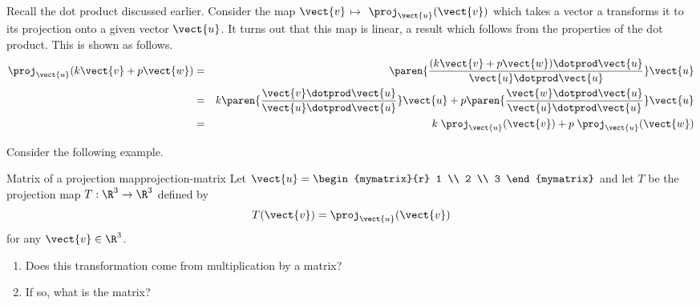 Recall the dot product discussed earlier. Consider the map $\vect{v}$\textbf{$\mapsto $}
$\proj_{\vect{u}}(\vect{v}) $ which takes a vector a transforms it to its projection onto a given vector $\vect{u}$. It turns out that
this map is linear, a result which follows from the properties of the
dot product. This is shown as follows.
\begin{eqnarray*}
\proj_{\vect{u}}(k \vect{v}+ p \vect{w})
&=&\paren{\vspace{0.05in}\frac{(k \vect{v}+ p \vect{w})\dotprod \vect{u}}{
\vect{u}\dotprod \vect{u}}} \vect{u} \\
&=& k  \paren{\vspace{0.05in}\frac{
\vect{v}\dotprod \vect{u}}{\vect{u}\dotprod \vect{u}}} \vect{u}+p \paren{\vspace{
0.05in}\frac{\vect{w}\dotprod \vect{u}}{\vect{u}\dotprod \vect{u}}} \vect{u} \\
&=& k \; \proj_{\vect{u}}(\vect{v}) +p \; \proj
_{\vect{u}}(\vect{w}) 
\end{eqnarray*}

Consider the following example.

\begin{example}{Matrix of a projection map}{projection-matrix}
Let $\vect{u} = \begin{mymatrix}{r}
1 \\
2 \\
3
\end{mymatrix}$ and let $T$ be the projection map $T: \R^3 \to \R^3$ defined by 
\[
T(\vect{v}) = \proj_{\vect{u}}(\vect{v})
\]
for any $\vect{v} \in \R^3$.  
\begin{enumerate}
\item Does this transformation come from
multiplication by a matrix?
\item If so, what is the matrix?
\end{enumerate}
\end{example}

